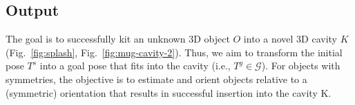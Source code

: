 \subsection{Output}
\label{subsec:output}
The goal is to successfully kit an unknown 3D object $O$ into a novel 3D cavity $K$ (Fig.~\ref{fig:splash}, Fig.~\ref{fig:mug-cavity-2}). Thus, we aim to transform the initial pose $T^s$ into a goal pose that fits into the cavity (i.e., $T^g \in \mathcal{G}$). For objects with symmetries, the objective is to estimate and orient objects relative to a (symmetric) orientation that results in successful insertion into the cavity K.

